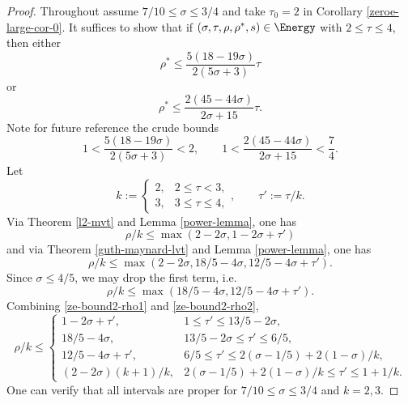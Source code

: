 \begin{proof}

Throughout assume $7/10 \le \sigma \le 3/4$ and take $\tau_0 = 2$ in Corollary \ref{zeroe-large-cor-0}. It suffices to show that if $(\sigma, \tau, \rho, \rho^*, s) \in \Energy$ with $2 \le \tau \le 4$, then either
\begin{equation}
\rho^* \le \frac{5(18 - 19\sigma)}{2(5\sigma + 3)}\tau
\end{equation}
or
\begin{equation}
\rho^* \le \frac{2(45 - 44\sigma)}{2\sigma + 15}\tau.
\end{equation}
Note for future reference the crude bounds
\begin{equation}\label{ze-bound2-tau-factor-bounds}
1 < \frac{5(18 - 19\sigma)}{2(5\sigma + 3)} < 2,\qquad 1 < \frac{2(45 - 44\sigma)}{2\sigma + 15} < \frac{7}{4}.
\end{equation}
Let
\[
k := \begin{cases}
2,& 2 \le \tau < 3,\\
3,& 3 \le \tau \le 4,
\end{cases},\qquad \tau' := \tau/k.
\]
Via Theorem \ref{l2-mvt} and Lemma \ref{power-lemma}, one has
\begin{equation}\label{ze-bound2-rho1}
\rho/k \le \max(2 - 2\sigma, 1 - 2\sigma + \tau')
\end{equation}
and via Theorem \ref{guth-maynard-lvt} and Lemma \ref{power-lemma}, one has
\[
\rho/k\le \max(2 - 2\sigma, 18/5 - 4\sigma, 12/5 - 4\sigma + \tau').
\]
Since $\sigma \le 4/5$, we may drop the first term, i.e.
\begin{equation}\label{ze-bound2-rho2}
\rho/k \le \max(18/5 - 4\sigma, 12/5 - 4\sigma + \tau').
\end{equation}
Combining \eqref{ze-bound2-rho1} and \eqref{ze-bound2-rho2},
\begin{equation}\label{ze-bound2-rhok-bound}
\rho/k \le \begin{cases}
1 - 2\sigma + \tau',&1 \le \tau' \le 13/5 - 2\sigma,\\
18/5 - 4\sigma,& 13/5 - 2\sigma \le \tau' \le 6/5,\\
12/5 - 4\sigma + \tau',& 6/5 \le \tau' \le 2(\sigma - 1/5) + 2(1 - \sigma)/k,\\
(2 - 2\sigma)(k + 1)/k,& 2(\sigma - 1/5) + 2(1 - \sigma)/k \le \tau' \le 1 + 1/k.
\end{cases}
\end{equation}
One can verify that all intervals are proper for $7/10 \le \sigma \le 3/4$ and $k = 2,3$.


\end{proof}
